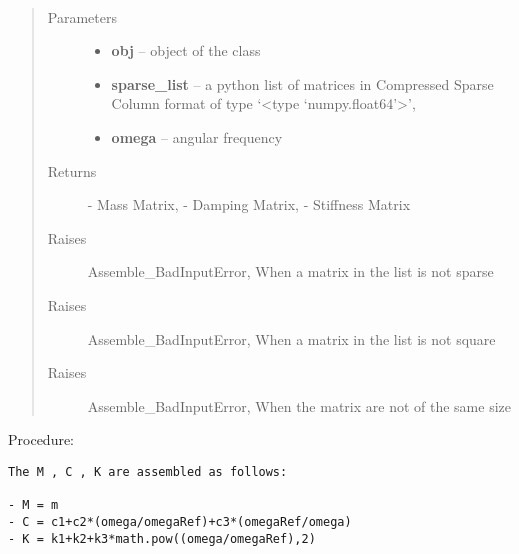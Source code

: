 \documentclass[letterpaper,10pt,english]{sphinxmanual}
\begin{document}
\begin{fulllineitems}
\label{index:brake.initialize.assemble.create_MCK}~\begin{quote}\begin{description}
\item[{Parameters}] \leavevmode\begin{itemize}
\item {} 
\textbf{obj} -- object of the class 

\item {} 
\textbf{sparse\_list} -- a python list of matrices in Compressed Sparse Column format 
of type `\textless{}type `numpy.float64'\textgreater{}',

\item {} 
\textbf{omega} -- angular frequency

\end{itemize}

\item[{Returns}] \leavevmode
{} - Mass Matrix,  - Damping Matrix,  - Stiffness Matrix

\item[{Raises }] \leavevmode
Assemble\_BadInputError, When a matrix in the list is not sparse

\item[{Raises }] \leavevmode
Assemble\_BadInputError, When a matrix in the list is not square

\item[{Raises }] \leavevmode
Assemble\_BadInputError, When the matrix  are not of the same size

\end{description}\end{quote}

Procedure:

\begin{Verbatim}[commandchars=\\\{\}]
The M , C , K are assembled as follows:

- M = m
- C = c1+c2*(omega/omegaRef)+c3*(omegaRef/omega)
- K = k1+k2+k3*math.pow((omega/omegaRef),2)
\end{Verbatim}

\end{fulllineitems}



\end{document}
